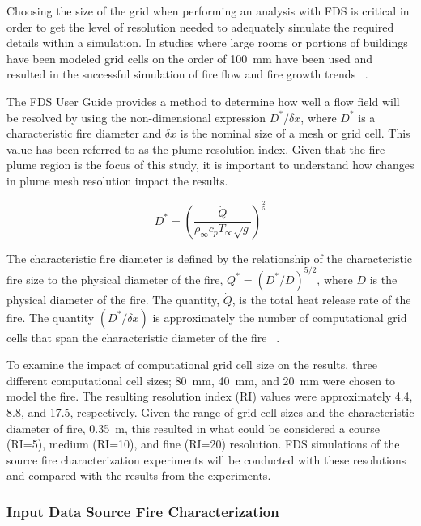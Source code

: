 \documentclass[twoside]{uocthesis}
\begin{document}
{Choosing the size of the grid when performing an analysis with FDS is critical in order to get the level of resolution needed to adequately simulate the required details within a simulation. In studies where large rooms or portions of buildings have been modeled grid cells on the order of 100~mm have been used and resulted in the successful simulation of fire flow and fire growth trends ~\cite{Grosshandler:Station,Madrzykowski:2004,Vettori:2000, Barowy:2012,Overholt:San_Francisco,Weinschenk:Chicago}.

 The FDS User Guide provides a method to determine how well a flow field will be resolved by using the non-dimensional expression ${D^*}/{\delta x}$, where $D^*$ is a characteristic fire diameter and $\delta x$ is the nominal size of a mesh or grid cell. This value has been referred to as the plume resolution index. Given that the fire plume region is the focus of this study, it is important to understand how changes in plume mesh resolution impact the results.    

\begin{equation}
 D^* = \left(
     \frac{\dot Q}{\rho_\infty  c_p  T_\infty  \sqrt{g} }
     \right)^\frac{2}{5} 
 \end{equation}

The characteristic fire diameter is defined by the relationship of the characteristic fire size to the physical diameter of the fire, ${Q^*} = ({D^*}/{D})^{5/2}$, where $D$ is the physical diameter of the fire. The quantity, $\dot Q$, is the total heat release rate of the fire. The quantity $({D^*}/{\delta x})$ is approximately the number of computational grid cells that span the characteristic diameter of the fire ~\cite{FDS_Users_Guide,FDS_Validation_Guide}.  

To examine the impact of computational grid cell size on the results, three different computational cell sizes; 80~mm, 40~mm, and 20~mm were chosen to model the fire. The resulting resolution index (RI) values were approximately 4.4, 8.8, and 17.5, respectively. Given the range of grid cell sizes and the characteristic diameter of fire, 0.35~m, this resulted in what could be considered a course (RI=5), medium (RI=10), and fine (RI=20) resolution.  FDS simulations of the source fire characterization experiments will be conducted with these resolutions and compared with the results from the experiments.

\subsubsection{Input Data Source Fire Characterization}

}
\end{document}
